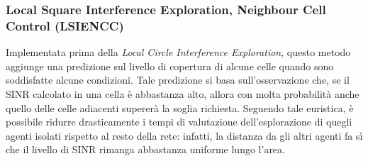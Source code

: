 \subsubsection{Local Square Interference Exploration, Neighbour Cell Control (LSIENCC)}
Implementata prima della \textit{Local Circle Interference Exploration}, questo metodo aggiunge una predizione sul livello di copertura di alcune celle quando sono soddisfatte alcune condizioni.
Tale predizione si basa sull'osservazione che, se il SINR calcolato in una cella è abbastanza alto, allora con molta probabilità anche quello delle celle adiacenti supererà la soglia richiesta.
Seguendo tale euristica, è possibile ridurre drasticamente i tempi di valutazione dell'esplorazione di quegli agenti isolati rispetto al resto della rete: infatti, la distanza da gli altri agenti fa sì che il livello di SINR rimanga abbastanza uniforme lungo l'area.